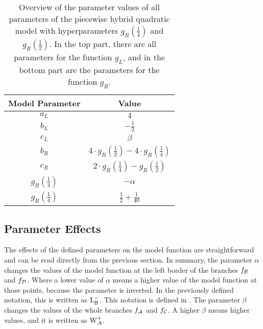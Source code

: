 \begin{table}
	\centering
	\begin{tabular}{|c|c|}
		\hline
		Model Parameter               & Value                                                                       \\ \hline \hline
		$a_L$                         & $4$                                                                         \\ \hline
		$b_L$                         & $-\frac{1}{2}$                                                              \\ \hline
		$c_L$                         & $\beta$                                                                     \\ \hline \hline
		$b_R$                         & $4 \cdot g_R\left(\frac{1}{2}\right) - 4 \cdot g_R\left(\frac{1}{4}\right)$ \\ \hline
		$c_R$                         & $2 \cdot g_R\left(\frac{1}{4}\right) - g_R\left(\frac{1}{2}\right)$         \\ \hline
		$g_R\left(\frac{1}{4}\right)$ & $-\alpha$                                                                   \\ \hline
		$g_R\left(\frac{1}{4}\right)$ & $\frac{1}{2} + \frac{1}{40}$                                                \\ \hline
	\end{tabular}
	\caption[Overview of parameters of the piecewise hybrid quadratic model with hyperparameters]{
		Overview of the parameter values of all parameters of the piecewise hybrid quadratic model with hyperparameters $g_R\left(\frac{1}{4}\right)$ and $g_R\left(\frac{1}{2}\right)$.
		In the top part, there are all parameters for the function $g_L$, and in the bottom part are the parameters for the function $g_R$.
	}
	\label{table:setup.quad.hybrid.parameters}
\end{table}

\subsection{Parameter Effects}
\label{sec:setup.quad.hybrid.parameterfx}

The effects of the defined parameters on the model function are straightforward and can be read directly from the previous section.
In summary, the parameter $\alpha$ changes the values of the model function at the left border of the branches $f_{\mathcal{B}}$ and $f_{\mathcal{D}}$.
Where a lower value of $\alpha$ means a higher value of the model function at those points, because the parameter is inverted.
In the previously defined notation, this is written as $\operatorname{L}_{\mathcal{B}}^-$.
This notation is defined in .
The parameter $\beta$ changes the values of the whole branches $f_{\mathcal{A}}$ and $f_{\mathcal{C}}$.
A higher $\beta$ means higher values, and it is written as $\operatorname{W}_{\mathcal{A}}^+$.

